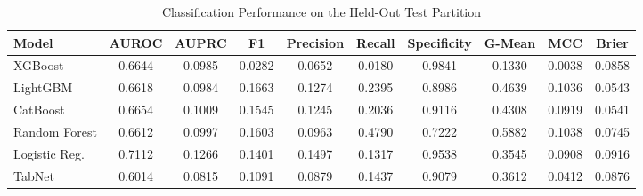 \begin{table}
\centering
\caption{Classification Performance on the Held-Out Test Partition}
\label{tab:results}
\begin{tabular}{lccccccccc}
\toprule
Model & AUROC & AUPRC & F1 & Precision & Recall & Specificity & G-Mean & MCC & Brier \\
\midrule
XGBoost & 0.6644 & 0.0985 & 0.0282 & 0.0652 & 0.0180 & 0.9841 & 0.1330 & 0.0038 & 0.0858 \\
LightGBM & 0.6618 & 0.0984 & 0.1663 & 0.1274 & 0.2395 & 0.8986 & 0.4639 & 0.1036 & 0.0543 \\
CatBoost & 0.6654 & 0.1009 & 0.1545 & 0.1245 & 0.2036 & 0.9116 & 0.4308 & 0.0919 & 0.0541 \\
Random Forest & 0.6612 & 0.0997 & 0.1603 & 0.0963 & 0.4790 & 0.7222 & 0.5882 & 0.1038 & 0.0745 \\
Logistic Reg. & 0.7112 & 0.1266 & 0.1401 & 0.1497 & 0.1317 & 0.9538 & 0.3545 & 0.0908 & 0.0916 \\
TabNet & 0.6014 & 0.0815 & 0.1091 & 0.0879 & 0.1437 & 0.9079 & 0.3612 & 0.0412 & 0.0876 \\
\bottomrule
\end{tabular}
\end{table}
